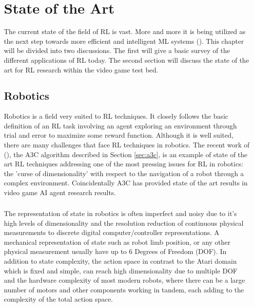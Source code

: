 \chapter{State of the Art} \label{ch:soa}
The current state of the field of RL is vast. More and more it is being utilized as the next step towards more efficient and intelligent ML systems (\citet{survey-drl}). This chapter will be divided into two discussions. The first will give a basic survey of the different applications of RL today. The second section will discuss the state of the art for RL research within the video game test bed.

\section{Robotics}
Robotics is a field very suited to RL techniques. It closely follows the basic definition of an RL task involving an agent exploring an environment through trial and error to maximize some reward function. Although it is well suited, there are many challenges that face RL techniques in robotics. The recent work of (\citet{a3c}), the A3C algorithm described in Section \ref{sec:a3c}, is an example of state of the art RL techniques addressing one of the most pressing issues for RL in robotics: the 'curse of dimensionality' with respect to the navigation of a robot through a complex environment. Coincidentally A3C has provided state of the art results in video game AI agent research results. \paragraph{}

The representation of state in robotics is often imperfect and noisy due to it's high levels of dimensionality and the resolution reduction of continuous physical measurements to discrete digital computer/controller representations. A mechanical representation of state such as robot limb position, or any other physical measurement usually have up to 6 Degrees of Freedom (DOF). In addition to state complexity, the action space in contrast to the Atari domain which is fixed and simple, can reach high dimensionality due to multiple DOF and the hardware complexity of most modern robots, where there can be a large number of motors and other components working in tandem, each adding to the complexity of the total action space. \paragraph{}

